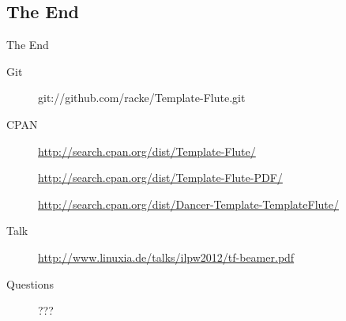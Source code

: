 \subsection{The End}
\begin{frame}{The End}
 \begin{description}
  \item[Git] git://github.com/racke/Template-Flute.git
  \item[CPAN] \url{http://search.cpan.org/dist/Template-Flute/}
  \item[]   \url{http://search.cpan.org/dist/Template-Flute-PDF/}
  \item[]   \url{http://search.cpan.org/dist/Dancer-Template-TemplateFlute/}
  \item[Talk]
    \url{http://www.linuxia.de/talks/ilpw2012/tf-beamer.pdf}
   \item[Questions] ???
 \end{description}
\end{frame}



